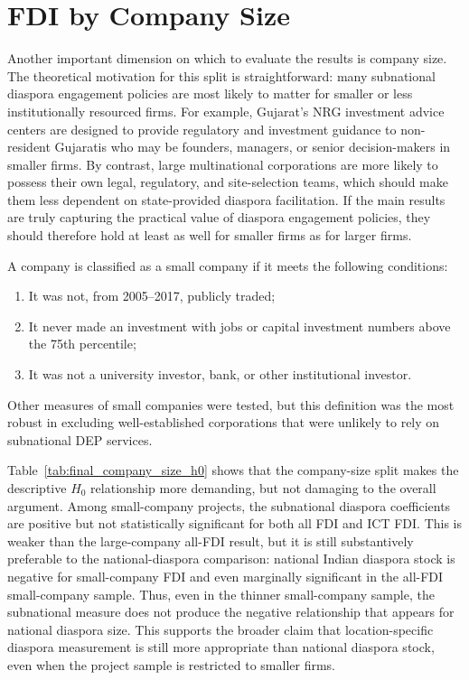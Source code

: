 \documentclass[doublespace,nopageskip]{UVAthesis}
\begin{document}
\FloatBarrier
\section{FDI by Company Size} \label{ss:comp size}

Another important dimension on which to evaluate the results is company size. The theoretical motivation for this split is straightforward: many subnational diaspora engagement policies are most likely to matter for smaller or less institutionally resourced firms. For example, Gujarat's NRG investment advice centers are designed to provide regulatory and investment guidance to non-resident Gujaratis who may be founders, managers, or senior decision-makers in smaller firms. By contrast, large multinational corporations are more likely to possess their own legal, regulatory, and site-selection teams, which should make them less dependent on state-provided diaspora facilitation. If the main results are truly capturing the practical value of diaspora engagement policies, they should therefore hold at least as well for smaller firms as for larger firms.

A company is classified as a small company if it meets the following conditions:
\begin{enumerate}
    \item It was not, from 2005--2017, publicly traded;
    \item It never made an investment with jobs or capital investment numbers above the 75th percentile;
    \item It was not a university investor, bank, or other institutional investor.
\end{enumerate}
Other measures of small companies were tested, but this definition was the most robust in excluding well-established corporations that were unlikely to rely on subnational DEP services.



Table~\ref{tab:final_company_size_h0} shows that the company-size split makes the descriptive $H_0$ relationship more demanding, but not damaging to the overall argument. Among small-company projects, the subnational diaspora coefficients are positive but not statistically significant for both all FDI and ICT FDI. This is weaker than the large-company all-FDI result, but it is still substantively preferable to the national-diaspora comparison: national Indian diaspora stock is negative for small-company FDI and even marginally significant in the all-FDI small-company sample. Thus, even in the thinner small-company sample, the subnational measure does not produce the negative relationship that appears for national diaspora size. This supports the broader claim that location-specific diaspora measurement is still more appropriate than national diaspora stock, even when the project sample is restricted to smaller firms.
\end{document}
